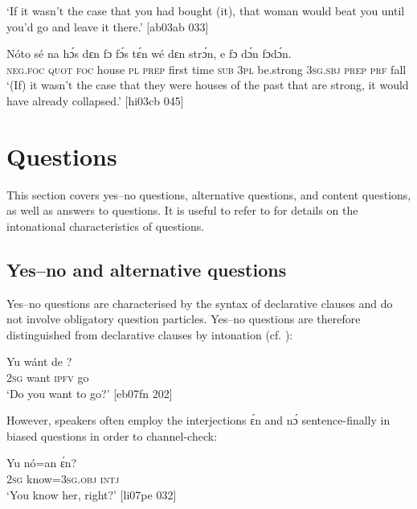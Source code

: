 \glt ‘If it wasn’t the case that you had bought (it), that woman would 
beat you until you’d go and leave it there.’ [ab03ab 033]
\z


\ea%
    \label{ex:key:581}
    \gll Nóto  sé    na  hɔ́s    dɛn  fɔ  fɔ́s  tɛ́n    wé  dɛn  strɔ́n,
e    fɔ  dɔ́n  fɔdɔ́n.\\
\textsc{neg}.\textsc{foc}  \textsc{quot}    \textsc{foc}  house  \textsc{pl}  \textsc{prep}  first time  \textsc{sub}  \textsc{3pl}  be.strong
\textsc{3sg.sbj}  \textsc{prep}  \textsc{prf}  fall\\

\glt ‘(If) it wasn’t the case that they were houses of the past that 
are strong, it would have already collapsed.’ [hi03cb 045]
\z

\section{Questions}\label{sec:7.3}

This section covers yes–no questions, alternative questions, and content questions, as well as answers to questions. It is useful to refer to  for details on the intonational characteristics of questions. 

\subsection{Yes–no and alternative questions}

Yes–no questions are characterised by the syntax of declarative clauses and do not involve obligatory question particles. Yes–no questions are therefore distinguished from declarative clauses by intonation (cf. ):


\ea%
    \label{ex:key:582}
    \gll Yu  wánt  de  ?\\
\textsc{2sg}  want  \textsc{ipfv}  go\\

\glt ‘Do you want to go?’ [eb07fn 202]
\z

However, speakers often employ the interjections ɛ́n and nɔ́ sentence-finally in biased questions in order to channel-check: 


\ea%
    \label{ex:key:583}
    \gll Yu  nó=an    ɛ́n?\\
\textsc{2sg}  know=\textsc{3sg.obj}  \textsc{intj}\\

\glt ‘You know her, right?’ [li07pe 032]
\z

